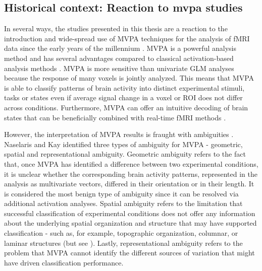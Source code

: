 \subsection{Historical context: Reaction to mvpa studies}
In several ways, the studies presented in this thesis are a reaction to the introduction and wide-spread use of MVPA techniques for the analysis of fMRI data since the early years of the millennium \parencite{Haxby2014}. MVPA is a powerful analysis method and has several advantages compared to classical activation-based analysis methods \parencite{Mur2009}. MVPA is more sensitive than univariate GLM analyses because the response of many voxels is jointly analyzed. This means that MVPA is able to classify patterns of brain activity into distinct experimental stimuli, tasks or states even if average signal change in a voxel or ROI does not differ across conditions. Furthermore, MVPA can offer an intuitive decoding of brain states that can be beneficially combined with real-time fMRI methods \parencite{LaConte2007}.

However, the interpretation of MVPA results is fraught with ambiguities \parencite{Bartels2008, Logothetis2008, Wang2014, Naselaris2015a}. Naselaris and Kay \parencite*{Naselaris2015a} identified three types of ambiguity for MVPA - geometric, spatial and representational ambiguity. Geometric ambiguity refers to the fact that, once MVPA has identified a difference between two experimental conditions, it is unclear whether the corresponding brain activity patterns, represented in the analysis as multivariate vectors, differed in their orientation or in their length. It is considered the most benign type of ambiguity since it can be resolved via additional activation analyses. Spatial ambiguity refers to the limitation that successful classification of experimental conditions does not offer any information about the underlying spatial organization and structure that may have supported classification - such as, for example, topographic organization, columnar, or laminar structures (but see \cite{Kriegeskorte2006}). Lastly, representational ambiguity refers to the problem that MVPA cannot identify the different sources of variation that might have driven classification performance.

